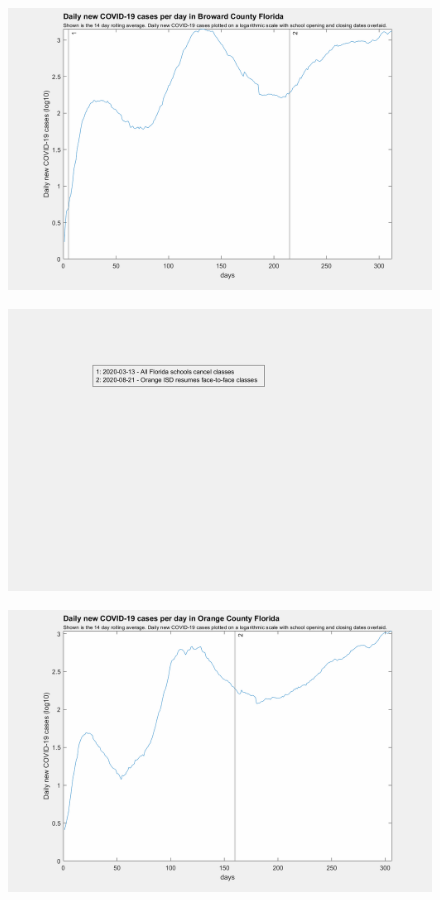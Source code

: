 \documentclass[]{article}
\begin{document}
\begin{figure}[!h]
	\includegraphics[width=\linewidth]{images/broward_cases_school_log.png}
	\caption{}
	\label{fig:images/broward_cases_school_logLabel}
\end{figure}

\begin{figure}[!h]
	\includegraphics[width=\linewidth]{legends/orange_school_legend.png}
	\caption{}
	\label{fig:legends/orange_school_legendLabel}
\end{figure}

\begin{figure}[!h]
	\includegraphics[width=\linewidth]{images/orange_cases_school_log.png}
	\caption{}
	\label{fig:images/orange_cases_school_logLabel}
\end{figure}
\end{document}
